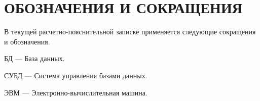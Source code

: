 \section*{\centering ОБОЗНАЧЕНИЯ И СОКРАЩЕНИЯ}

В текущей расчетно-пояснительной записке применяется следующие сокращения и обозначения.

\begin{description}[leftmargin=0pt]
	\item \noindent БД --- База данных.
	\item \noindent СУБД --- Система управления базами данных.
	\item \noindent ЭВМ --- Электронно-вычислительная машина.
\end{description}


